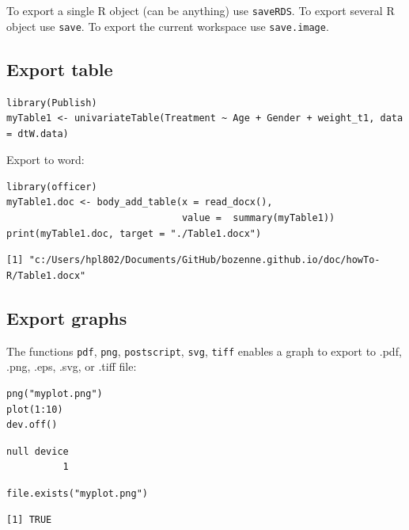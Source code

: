 \documentclass{article}
\begin{document}
To export a single R object (can be anything) use \texttt{saveRDS}.
To export several R object use \texttt{save}.
To export the current workspace use \texttt{save.image}.

\subsection{Export table}
\label{sec:org8e64aab}

\lstset{language=r,label= ,caption= ,captionpos=b,numbers=none}
\begin{lstlisting}
library(Publish)
myTable1 <- univariateTable(Treatment ~ Age + Gender + weight_t1, data = dtW.data)
\end{lstlisting}

Export to word:
\lstset{language=r,label= ,caption= ,captionpos=b,numbers=none}
\begin{lstlisting}
library(officer)
myTable1.doc <- body_add_table(x = read_docx(), 
							   value =  summary(myTable1)) 
print(myTable1.doc, target = "./Table1.docx")
\end{lstlisting}

\begin{verbatim}
[1] "c:/Users/hpl802/Documents/GitHub/bozenne.github.io/doc/howTo-R/Table1.docx"
\end{verbatim}

\subsection{Export graphs}
\label{sec:orge62b126}

The functions \texttt{pdf}, \texttt{png}, \texttt{postscript}, \texttt{svg}, \texttt{tiff} enables a graph to
export to .pdf, .png, .eps, .svg, or .tiff file:
\lstset{language=r,label= ,caption= ,captionpos=b,numbers=none}
\begin{lstlisting}
png("myplot.png")
plot(1:10)
dev.off()
\end{lstlisting}

\begin{verbatim}
null device 
          1
\end{verbatim}

\lstset{language=r,label= ,caption= ,captionpos=b,numbers=none}
\begin{lstlisting}
file.exists("myplot.png")
\end{lstlisting}

\begin{verbatim}
[1] TRUE
\end{verbatim}
\end{document}

